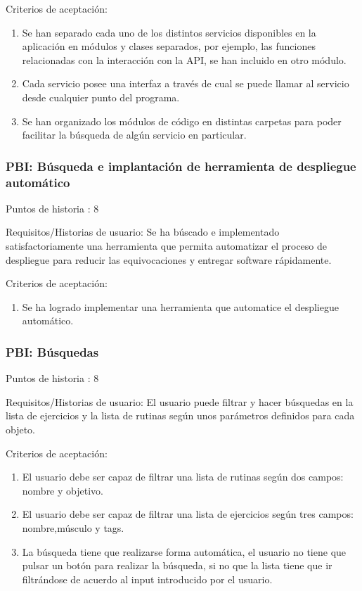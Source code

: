 \documentclass[11pt,a4paper]{report}
\begin{document}
Criterios de aceptación:
\begin{enumerate}
	\item Se han separado cada uno de los distintos servicios disponibles en la aplicación en módulos y clases separados, por ejemplo, las funciones relacionadas con la interacción con la API, se han incluido en otro módulo.

	\item Cada servicio posee una interfaz a través de cual se puede llamar al servicio desde cualquier punto del programa.

	\item Se han organizado los módulos de código en distintas carpetas para poder facilitar la búsqueda de algún servicio en particular.

\end{enumerate}
\subsubsection{PBI: Búsqueda e implantación de herramienta de despliegue automático}
Puntos de historia : 8

Requisitos/Historias de usuario: Se ha búscado e implementado satisfactoriamente una herramienta que permita automatizar el proceso de despliegue para reducir las equivocaciones y entregar software rápidamente.

Criterios de aceptación:
\begin{enumerate}
	\item Se ha logrado implementar una herramienta que automatice el despliegue automático.
\end{enumerate}
\subsubsection{PBI: Búsquedas}
Puntos de historia : 8

Requisitos/Historias de usuario: El usuario puede filtrar y hacer búsquedas en la lista de ejercicios y la lista de rutinas según unos parámetros definidos para cada objeto.

Criterios de aceptación:
\begin{enumerate}
	\item El usuario debe ser capaz de filtrar una lista de rutinas según dos campos: nombre y objetivo.

	\item El usuario debe ser capaz de filtrar una lista de ejercicios según tres campos: nombre,músculo y tags.

	\item La búsqueda tiene que realizarse forma automática, el usuario no tiene que pulsar un botón para realizar la búsqueda, si no que la lista tiene que ir filtrándose de acuerdo al input introducido por el usuario.

\end{enumerate}
\end{document}
